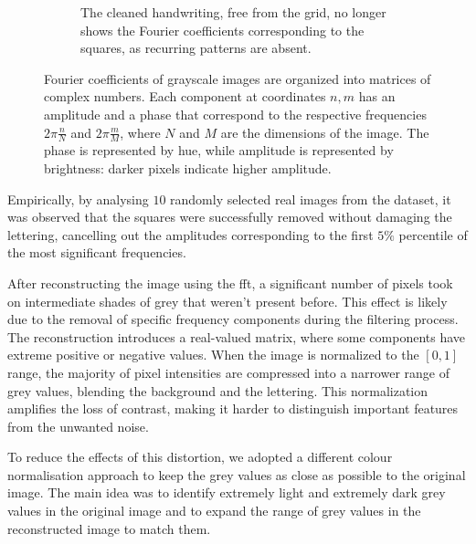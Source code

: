 \begin{figure}
\begin{subfigure}[t]{\linewidth}
		\caption{The cleaned handwriting, free from the grid, no longer shows the Fourier coefficients corresponding to the squares, as recurring patterns are absent.}
		\label{fig:synthetic_clean_fft}
	\end{subfigure}
	\caption[Synthetic FFT test]{Fourier coefficients of grayscale images are organized into matrices of complex numbers. Each component at coordinates $n,m$ has an amplitude and a phase that correspond to the respective frequencies $2\pi\frac{n}{N}$ and $2\pi\frac{m}{M}$, where $N$ and $M$ are the dimensions of the image. The phase is represented by hue, while amplitude is represented by brightness: darker pixels indicate higher amplitude.}
\end{figure}

    \noindent Empirically, by analysing $10$ randomly selected real images from the dataset, it was observed that the squares were successfully removed without damaging the lettering, cancelling out the amplitudes corresponding to the first $5\%$ percentile of the most significant frequencies.

	\begin{modified}
    \noindent After reconstructing the image using the \gls{fft}, a significant number of pixels took on intermediate shades of grey that weren't present before. This effect is likely due to the removal of specific frequency components during the filtering process. The reconstruction introduces a real-valued matrix, where some components have extreme positive or negative values. When the image is normalized to the $[0,1]$ range, the majority of pixel intensities are compressed into a narrower range of grey values, blending the background and the lettering. This normalization amplifies the loss of contrast, making it harder to distinguish important features from the unwanted noise.
	\end{modified}

	\noindent To reduce the effects of this distortion, we adopted a different colour normalisation approach to keep the grey values as close as possible to the original image. The main idea was to identify extremely light and extremely dark grey values in the original image and to expand the range of grey values in the reconstructed image to match them.

